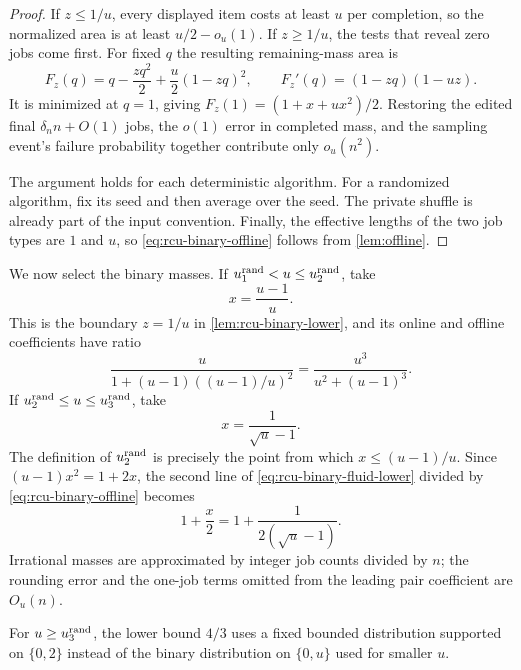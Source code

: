 \begin{proof}
If $z\le1/u$, every displayed item costs at least $u$ per completion, so the
normalized area is at least $u/2-o_u(1)$.  If $z\ge1/u$, the tests that
reveal zero jobs come first.  For fixed $q$ the resulting remaining-mass area is
\begin{equation}
 F_z(q)=q-\frac{zq^2}{2}+\frac u2(1-zq)^2,
 \qquad
 F_z'(q)=(1-zq)(1-uz).
 \label{eq:rcu-binary-F}
\end{equation}
It is minimized at $q=1$, giving
$F_z(1)=(1+x+ux^2)/2$.  Restoring the edited final $\delta_n n+O(1)$ jobs,
the $o(1)$ error in completed mass, and the sampling event's failure
probability together contribute only $o_u(n^2)$.

The argument holds for each deterministic algorithm.  For a randomized algorithm,
fix its seed and then average over the seed.  The private shuffle is already
part of the input convention.  Finally, the effective lengths of the two job types are
$1$ and $u$, so \eqref{eq:rcu-binary-offline} follows from
\cref{lem:offline}.
\end{proof}

We now select the binary masses.  If $u_{1}^{\mathrm{rand}}<u\le u_{2}^{\mathrm{rand}}$, take
\begin{equation}
 x=\frac{u-1}{u}.
 \label{eq:rcu-lower-x-crossing}
\end{equation}
This is the boundary $z=1/u$ in \cref{lem:rcu-binary-lower}, and its online
and offline coefficients have ratio
\begin{equation}
 \frac{u}{1+(u-1)((u-1)/u)^2}
 =\frac{u^3}{u^2+(u-1)^3}.
 \label{eq:rcu-lower-first-branch}
\end{equation}
If $u_{2}^{\mathrm{rand}}\le u\le u_{3}^{\mathrm{rand}}$, take
\begin{equation}
 x=\frac1{\sqrt u-1}.
 \label{eq:rcu-lower-x-stationary}
\end{equation}
The definition of $u_{2}^{\mathrm{rand}}$ is precisely the point from which
$x\le(u-1)/u$.  Since $(u-1)x^2=1+2x$, the second line of
\eqref{eq:rcu-binary-fluid-lower} divided by
\eqref{eq:rcu-binary-offline} becomes
\begin{equation}
 1+\frac x2=1+\frac1{2(\sqrt u-1)}.
 \label{eq:rcu-lower-second-branch}
\end{equation}
Irrational masses are approximated by integer job counts divided by $n$; the
rounding error and the one-job terms omitted from the leading pair
coefficient are $O_u(n)$.

For $u\ge u_{3}^{\mathrm{rand}}$, the lower bound $4/3$ uses a fixed bounded
distribution supported on $\{0,2\}$ instead of the binary distribution on
$\{0,u\}$ used for smaller $u$.

